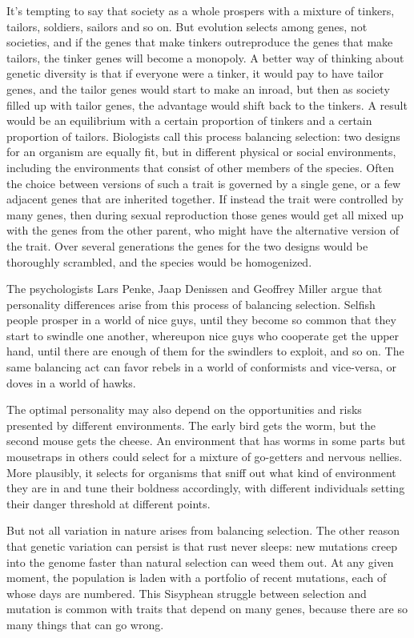 It's tempting to say that society as a whole prospers with a mixture of
tinkers, tailors, soldiers, sailors and so on. But evolution selects
among genes, not societies, and if the genes that make tinkers
outreproduce the genes that make tailors, the tinker genes will become a
monopoly. A better way of thinking about genetic diversity is that if
everyone were a tinker, it would pay to have tailor genes, and the
tailor genes would start to make an inroad, but then as society filled
up with tailor genes, the advantage would shift back to the tinkers. A
result would be an equilibrium with a certain proportion of tinkers and
a certain proportion of tailors. Biologists call this process balancing
selection: two designs for an organism are equally fit, but in different
physical or social environments, including the environments that consist
of other members of the species. Often the choice between versions of
such a trait is governed by a single gene, or a few adjacent genes that
are inherited together. If instead the trait were controlled by many
genes, then during sexual reproduction those genes would get all mixed
up with the genes from the other parent, who might have the alternative
version of the trait. Over several generations the genes for the two
designs would be thoroughly scrambled, and the species would be
homogenized.

The psychologists Lars Penke, Jaap Denissen and Geoffrey Miller argue
that personality differences arise from this process of balancing
selection. Selfish people prosper in a world of nice guys, until they
become so common that they start to swindle one another, whereupon nice
guys who cooperate get the upper hand, until there are enough of them
for the swindlers to exploit, and so on. The same balancing act can
favor rebels in a world of conformists and vice-versa, or doves in a
world of hawks.

The optimal personality may also depend on the opportunities and risks
presented by different environments. The early bird gets the worm, but
the second mouse gets the cheese. An environment that has worms in some
parts but mousetraps in others could select for a mixture of go-getters
and nervous nellies. More plausibly, it selects for organisms that sniff
out what kind of environment they are in and tune their boldness
accordingly, with different individuals setting their danger threshold
at different points.

But not all variation in nature arises from balancing selection. The
other reason that genetic variation can persist is that rust never
sleeps: new mutations creep into the genome faster than natural
selection can weed them out. At any given moment, the population is
laden with a portfolio of recent mutations, each of whose days are
numbered. This Sisyphean struggle between selection and mutation is
common with traits that depend on many genes, because there are so many
things that can go wrong.

